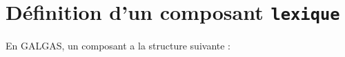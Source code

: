 









\section{Définition d'un composant \texttt{lexique}}


En GALGAS, un composant  a la structure suivante :

